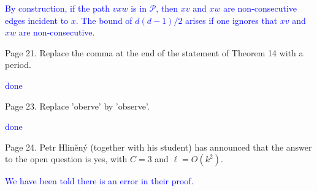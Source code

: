 \documentclass[12pt]{article}
\newcommand{\done}{\textcolor{blue}{done}}
\begin{document}
\textcolor{blue}{By construction, if the path $vxw$ is in $\mathcal{P}$, then $xv$ and $xw$ are non-consecutive edges incident to $x$. The bound of $d(d-1)/2$ arises if one ignores that $xv$ and $xw$ are non-consecutive.}


Page 21.  Replace the comma at the end of the statement of Theorem 14
with a period.

\done

Page 23. Replace 'oberve' by 'observe'.

\done

Page 24. Petr Hliněný (together with his student) has announced that
the answer to the open question is yes, with $C=3$ and $\ell=O(k^2)$.

\textcolor{blue}{We have been told there is an error in their proof.}
\end{document}
